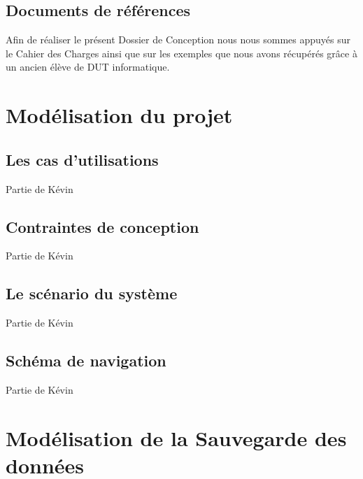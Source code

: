 \documentclass[11pt]{article}
\begin{document}
\subsection{Documents de références}

Afin de réaliser le présent Dossier de Conception nous nous sommes appuyés sur le Cahier des Charges ainsi que sur les
exemples que nous avons récupérés grâce à un ancien élève de DUT informatique.




\newpage


\section{Modélisation du projet}


\subsection{Les cas d'utilisations}

Partie de Kévin
\subsection{Contraintes de conception}

Partie de Kévin
\subsection{Le scénario du système}

Partie de Kévin
\subsection{Schéma de navigation}

Partie de Kévin


\newpage

\section{Modélisation de la Sauvegarde des données}
\end{document}
